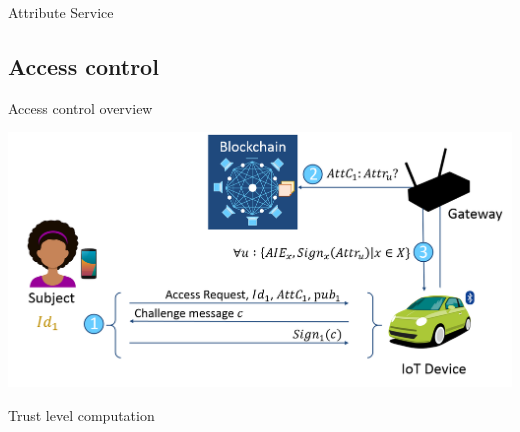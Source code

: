 \begin{frame}{Attribute Service}
\begin{center}
    \end{center}
\end{frame}

\subsection{Access control}

\begin{frame}{Access control overview}
    \begin{center}
        \includegraphics[scale=0.36]{Figures/MAAC-B_AC.png}
    \end{center}
\end{frame}

\begin{frame}{Trust level computation}
    \begin{center}
    \end{center}
\end{frame}

